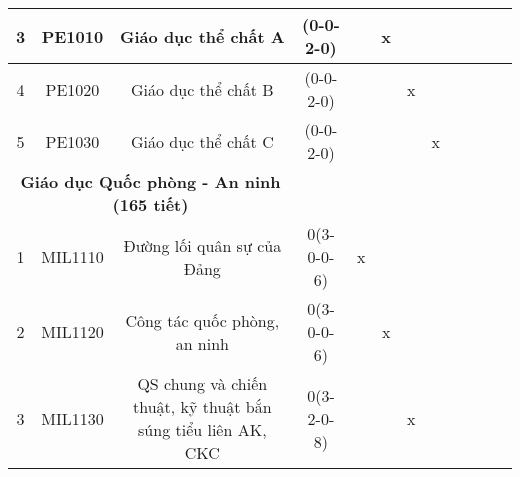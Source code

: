 \documentclass[12pt,a4paper]{report}
\begin{document}
\begin{landscape}
\begin{longtable}[c]{|c|c|c|c|c|c|c|c|c|c|c|c|}
        3                             & PE1010                          & Giáo dục thể chất A                                          & (0-0-2-0)                                                                            &             & x           &             &             &             &             &             &             \\ \hline
        4                             & PE1020                          & Giáo dục thể chất B                                          & (0-0-2-0)                                                                            &             &             & x           &             &             &             &             &             \\ \hline
        5                             & PE1030                          & Giáo dục thể chất C                                          & (0-0-2-0)                                                                            &             &             &             & x           &             &             &             &             \\ \hline
        \multicolumn{3}{|c|}{\textbf{Giáo dục Quốc phòng - An ninh (165 tiết)}}                                                        &                                                                                      &             &             &             &             &             &             &             &             \\ \hline
        1                             & MIL1110                         & Đường lối quân sự của Đảng                                   & 0(3-0-0-6)                                                                           & x           &             &             &             &             &             &             &             \\ \hline
        2                             & MIL1120                         & Công tác quốc phòng, an ninh                                 & 0(3-0-0-6)                                                                           &             & x           &             &             &             &             &             &             \\ \hline
        3                             & MIL1130                         & QS chung và chiến thuật, kỹ thuật bắn súng tiểu liên AK, CKC & 0(3-2-0-8)                                                                           &             &             & x           &             &             &             &             &             \\ \hline

\end{longtable}
\end{landscape}
\end{document}
